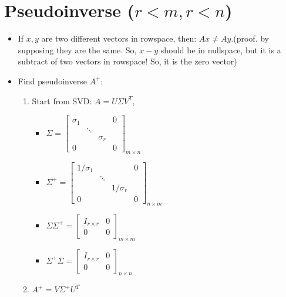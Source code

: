 \documentclass[a4paper,12pt]{article}
\theoremstyle{definition} \newtheorem{Theorem}{Theorem}
\begin{document}
\section{Pseudoinverse ($r<m, r<n$)}
\begin{itemize}
\item If $x, y$ are two different vectors in rowspace, then: $Ax \neq Ay$.(proof. by supposing they are the
 same. So, $x-y$ should be in nullspace, but it is a subtract of two vectors in rowspace! So, it is the zero vector)

\item Find pseudoinverse $A^{+}$:
\begin{enumerate}
\item Start from SVD: $A = U \Sigma V^T$, 
\begin{itemize}
\item $\Sigma = \begin{bmatrix}\sigma_1 &        & 	     & 0 \\ 
							    & \ddots & 	     &   \\
					 	 	    & 	     & \sigma_r &   \\
						    0	    &        &	     & 0
				    \end{bmatrix}_{m \times n}$
\item $\Sigma^{+} = \begin{bmatrix}1/ \sigma_1 &        & 	     & 0 \\ 
							    & \ddots & 	     &   \\
					 	 	    & 	     & 1/ \sigma_r &   \\
						    0	    &        &	     & 0
				    \end{bmatrix}_{n \times m}$
\item $\Sigma \Sigma^{+} = \begin{bmatrix} I_{r\times r} & 0 \\ 0 & 0 \end{bmatrix}_{m \times m}$
\item $\Sigma^{+} \Sigma = \begin{bmatrix} I_{r\times r} & 0 \\ 0 & 0 \end{bmatrix}_{n \times n}$
\end{itemize}
\item $A^{+} = V \Sigma^{+} U^T$
\end{enumerate}
\end{itemize}
\end{document}

